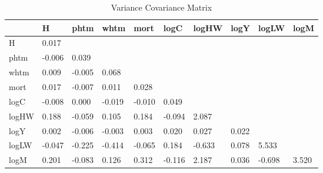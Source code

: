 \begin{table}[htbp]
\caption{\label{clabel} Variance Covariance Matrix}\centering\medskip
\begin{tabular}{llllllllll} \hline \hline
 & H  & phtm  & whtm  & mort  & logC  & logHW  & logY  & logLW  & logM  \\  \hline 
H &     0.017 \\  
phtm &    -0.006 &     0.039 \\  
whtm &     0.009 &    -0.005 &     0.068 \\  
mort &     0.017 &    -0.007 &     0.011 &     0.028 \\  
logC &    -0.008 &     0.000 &    -0.019 &    -0.010 &     0.049 \\  
logHW &     0.188 &    -0.059 &     0.105 &     0.184 &    -0.094 &     2.087 \\  
logY &     0.002 &    -0.006 &    -0.003 &     0.003 &     0.020 &     0.027 &     0.022 \\  
logLW &    -0.047 &    -0.225 &    -0.414 &    -0.065 &     0.184 &    -0.633 &     0.078 &     5.533 \\  
logM &     0.201 &    -0.083 &     0.126 &     0.312 &    -0.116 &     2.187 &     0.036 &    -0.698 &     3.520 \\  
\hline \hline \end{tabular}
\end{table}
